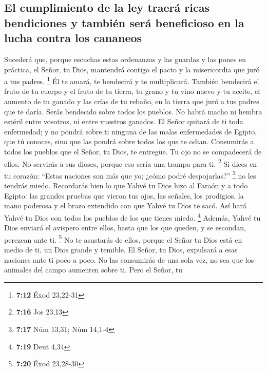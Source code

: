 \begin{paracol}{2}
\hypertarget{el-cumplimiento-de-la-ley-traeruxe1-ricas-bendiciones-y-tambiuxe9n-seruxe1-beneficioso-en-la-lucha-contra-los-cananeos}{%
\subsection{El cumplimiento de la ley traerá ricas bendiciones y también
será beneficioso en la lucha contra los
cananeos}\label{el-cumplimiento-de-la-ley-traeruxe1-ricas-bendiciones-y-tambiuxe9n-seruxe1-beneficioso-en-la-lucha-contra-los-cananeos}}

 Sucederá que, porque escuchas estas ordenanzas y las
guardas y las pones en práctica, el Señor, tu Dios, mantendrá contigo el
pacto y la misericordia que juró a tus padres. \footnote{\textbf{7:12}
  Éxod 23,22-31}  Él te amará, te bendecirá y te
multiplicará. También bendecirá el fruto de tu cuerpo y el fruto de tu
tierra, tu grano y tu vino nuevo y tu aceite, el aumento de tu ganado y
las crías de tu rebaño, en la tierra que juró a tus padres que te daría.
 Serás bendecido sobre todos los pueblos. No habrá macho
ni hembra estéril entre vosotros, ni entre vuestros ganados.
 El Señor quitará de ti toda enfermedad; y no pondrá
sobre ti ninguna de las malas enfermedades de Egipto, que tú conoces,
sino que las pondrá sobre todos los que te odian. 
Consumirás a todos los pueblos que el Señor, tu Dios, te entregue. Tu
ojo no se compadecerá de ellos. No servirás a sus dioses, porque eso
sería una trampa para ti. \footnote{\textbf{7:16} Jos 23,13}
 Si dices en tu corazón: ``Estas naciones son más que yo;
¿cómo podré despojarlas?'' \footnote{\textbf{7:17} Núm 13,31; Núm 14,1-4}
 no les tendrás miedo. Recordarás bien lo que Yahvé tu
Dios hizo al Faraón y a todo Egipto:  las grandes pruebas
que vieron tus ojos, las señales, los prodigios, la mano poderosa y el
brazo extendido con que Yahvé tu Dios te sacó. Así hará Yahvé tu Dios
con todos los pueblos de los que tienes miedo. \footnote{\textbf{7:19}
  Deut 4,34}  Además, Yahvé tu Dios enviará el avispero
entre ellos, hasta que los que queden, y se escondan, perezcan ante ti.
\footnote{\textbf{7:20} Éxod 23,28-30}  No te asustarás
de ellos, porque el Señor tu Dios está en medio de ti, un Dios grande y
temible.  El Señor, tu Dios, expulsará a esas naciones
ante ti poco a poco. No las consumirás de una sola vez, no sea que los
animales del campo aumenten sobre ti.  Pero el Señor, tu

\end{paracol}
